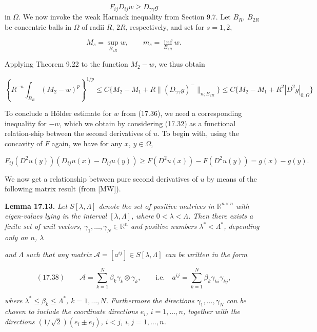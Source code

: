 \begin{equation}\tag{17.35}
F_{ij}D_{ij}w \ge D_{\gamma\gamma}g
\end{equation}
in $\Omega$. We now invoke the weak Harnack inequality from Section 9.7. Let $B_R$, $B_{2R}$ be concentric balls in $\Omega$ of radii $R$, $2R$, respectively, and set for $s = 1,2$,

\[
M_s = \sup_{B_{sR}} w, \qquad m_s = \inf_{B_{sR}} w.
\]

Applying Theorem 9.22 to the function $M_2 - w$, we thus obtain

\begin{equation}\tag{17.36}
\left\{R^{-n}\int_{B_R}(M_2 - w)^p\right\}^{1/p}
\le C\{M_2 - M_1 + R\|(D_{\gamma\gamma}g)^-\|_{n;B_{2R}}\}
\le C\{M_2 - M_1 + R^2|D^2g|_{0;\Omega}\}
\end{equation}

To conclude a Hölder estimate for $w$ from (17.36), we need a corresponding inequality for $-w$, which we obtain by considering (17.32) as a functional relation-ship between the second derivatives of $u$. To begin with, using the concavity of $F$ again, we have for any $x$, $y\in\Omega$,

\begin{equation}\tag{17.37}
F_{ij}(D^2u(y))(D_{ij}u(x) - D_{ij}u(y)) \ge F(D^2u(x)) - F(D^2u(y))
= g(x) - g(y).
\end{equation}

We now get a relationship between pure second derivatives of $u$ by means of the following matrix result (from [MW]).

\textbf{Lemma 17.13.} \textit{Let $S[\lambda, \Lambda]$ denote the set of positive matrices in $\mathbb{R}^{n\times n}$ with eigen-values lying in the interval $[\lambda, \Lambda]$, where $0 < \lambda < \Lambda$. Then there exists a finite set of unit vectors, $\gamma_1,\ldots,\gamma_N \in \mathbb{R}^n$ and positive numbers $\lambda^* < \Lambda^*$, depending only on $n$, $\lambda$}


\textit{and $\Lambda$ such that any matrix $\mathcal A=[a^{ij}]\in S[\lambda,\Lambda]$ can be written in the form}

\[
(17.38)\qquad \mathcal A=\sum_{k=1}^{N}\beta_k\gamma_k\otimes\gamma_k,\qquad \text{i.e.}\quad
a^{ij}=\sum_{k=1}^{N}\beta_k\gamma_{ki}\gamma_{kj},
\]

\textit{where $\lambda^{*}\leq \beta_k\leq \Lambda^{*}$, $k=1,\ldots,N$. Furthermore the directions
$\gamma_1,\ldots,\gamma_N$ can be chosen to include the coordinate directions $e_i$, $i=1,\ldots,n$, together with the directions
$(1/\sqrt{2})(e_i\pm e_j)$, $i<j$, $i,j=1,\ldots,n$.}

